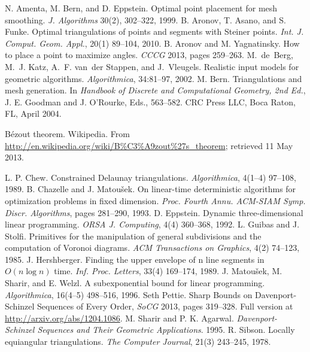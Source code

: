 \documentclass{cccg13}
\begin{document}
\begin{thebibliography}{}
 N. Amenta, M. Bern, and D. Eppstein.
	Optimal point placement for mesh smoothing.
	\emph{J. Algorithms} 30(2), 302--322, 1999.
 B. Aronov, T. Asano, and S. Funke.	
	Optimal triangulations of points and segments with Steiner points.
	\emph{Int. J. Comput. Geom. Appl.},
	20(1) 89--104, 2010.
	B. Aronov and M. Yagnatinsky.
	How to place a point to maximize angles.
	\emph{CCCG} 2013, pages 259--263.
	M.~de~Berg, M.~J. Katz, A.~F. van~der Stappen, and J.~Vleugels.
	Realistic input models for geometric algorithms.
	\emph{Algorithmica}, 34:81--97, 2002.
 M. Bern.  Triangulations and mesh generation.
	In \emph{Handbook of Discrete and Computational Geometry, 2nd Ed.},
	J. E. Goodman and J. O'Rourke, Eds., 563--582.
	CRC Press LLC, Boca Raton, FL, April 2004.

{\raggedright {}
	B\'ezout theorem.  Wikipedia.  From
	\url{http://en.wikipedia.org/wiki/B\%C3\%A9zout\%27s\_theorem}; retrieved 11 May 2013.

} L. P. Chew. Constrained Delaunay triangulations.
	\emph{Algorithmica}, 4(1--4) 97--108, 1989.
 B. Chazelle and J. Matou\v{s}ek.
	On linear-time deterministic algorithms for optimization problems in fixed dimension.
	\emph{Proc. Fourth Annu. ACM-SIAM Symp. Discr. Algorithms}, pages 281--290, 1993.
 D. Eppstein.  Dynamic three-dimensional linear programming.
        \emph{ORSA J. Computing},
        4(4) 360--368, 1992.
 L. Guibas and J. Stolfi.
  Primitives for the manipulation of general subdivisions and the computation of Voronoi diagrams.
  \emph{ACM Transactions on Graphics}, 4(2) 74--123, 1985.
 J. Hershberger.
	Finding the upper envelope of n line segments in $O(n\log n)$ time.
	\emph{Inf. Proc. Letters}, 33(4) 169--174, 1989.
 J. Matou\v sek, M. Sharir, and E. Welzl.
  A subexponential bound for linear programming.
  \emph{Algorithmica}, 16(4--5) 498--516, 1996.
  Seth Pettie. Sharp Bounds on Davenport-Schinzel Sequences of Every Order,
	\emph{SoCG} 2013, pages 319--328.  Full version at \url{http://arxiv.org/abs/1204.1086}.
 M. Sharir and P. K. Agarwal.
	\emph{Davenport-Schinzel Sequences and Their Geometric Applications}. 1995.
 R. Sibson.  Locally equiangular triangulations.
	\emph{The Computer Journal}, 21(3) 243--245, 1978.
\end{thebibliography}
\ifcccg\balance\fi
\end{document}
